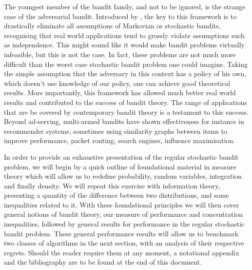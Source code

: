 \par The youngest member of the bandit family, and not to be ignored, is the strange case of the adversarial bandit. Introduced by \citet{auer:1995}, the key to this framework is to drastically eliminate all assumptions of Markovian or stochastic bandits, recognising that real world applications tend to grossly violate assumptions such as independence. This might sound like it would make bandit problems virtually infeasible, but this is not the case. In fact, these problems are not much more difficult than the worst case stochastic bandit problem one could imagine\cite{bubeck:2012}. Taking the simple assumption that the adversary in this context has a policy of his own, which doesn't use knowledge of our policy, one can achieve good theoretical results. More importantly, this framework has allowed much better real world results and contributed to the success of bandit theory. The range of applications that are be covered by contemporary bandit theory is a testament to this success. Beyond ad-serving, multi-armed bandits have shown effectiveness for instance in recommender systems, sometimes using similarity graphs between items to improve performance\cite{valko:2014}, packet routing\cite{awerbuch:2004}, search engines\cite{yue:2009}, influence maximisation\cite{vaswani:2015}.  


\par In order to provide an exhaustive presentation of the regular stochastic bandit problem, we will begin by a quick outline of foundational material in measure theory which will allow us to redefine probability, random variables, integration and finally density. We will repeat this exercise with information theory, presenting a quantity of the difference between two distributions, and some inequalities related to it. With these foundational principles we will then cover general notions of bandit theory, our measure of performance and concentration inequalities, followed by general results for performance in the regular stochastic bandit problem. These general performance results will allow us to benchmark two classes of algorithms in the next section, with an analysis of their respective regrets.  Should the reader require them at any moment, a notational appendix and the bibliography are to be found at the end of this document. 



